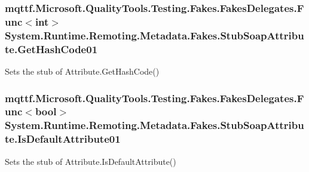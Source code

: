 \hypertarget{class_system_1_1_runtime_1_1_remoting_1_1_metadata_1_1_fakes_1_1_stub_soap_attribute_a0f4aef8787c6dee69063ea49327bfce8}{
\subsubsection[{Get\-Hash\-Code01}]{\setlength{\rightskip}{0pt plus 5cm}mqttf.\-Microsoft.\-Quality\-Tools.\-Testing.\-Fakes.\-Fakes\-Delegates.\-Func$<$int$>$ System.\-Runtime.\-Remoting.\-Metadata.\-Fakes.\-Stub\-Soap\-Attribute.\-Get\-Hash\-Code01}}\label{class_system_1_1_runtime_1_1_remoting_1_1_metadata_1_1_fakes_1_1_stub_soap_attribute_a0f4aef8787c6dee69063ea49327bfce8}


Sets the stub of Attribute.\-Get\-Hash\-Code()

\hypertarget{class_system_1_1_runtime_1_1_remoting_1_1_metadata_1_1_fakes_1_1_stub_soap_attribute_a81e5b7edaec31e944e541ba2ced3bd9d}{
\subsubsection[{Is\-Default\-Attribute01}]{\setlength{\rightskip}{0pt plus 5cm}mqttf.\-Microsoft.\-Quality\-Tools.\-Testing.\-Fakes.\-Fakes\-Delegates.\-Func$<$bool$>$ System.\-Runtime.\-Remoting.\-Metadata.\-Fakes.\-Stub\-Soap\-Attribute.\-Is\-Default\-Attribute01}}\label{class_system_1_1_runtime_1_1_remoting_1_1_metadata_1_1_fakes_1_1_stub_soap_attribute_a81e5b7edaec31e944e541ba2ced3bd9d}


Sets the stub of Attribute.\-Is\-Default\-Attribute()

